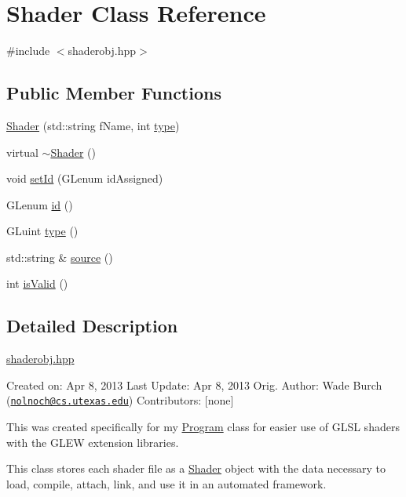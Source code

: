 \hypertarget{classShader}{\section{Shader Class Reference}
\label{classShader}
}


{\ttfamily \#include $<$shaderobj.\-hpp$>$}

\subsection*{Public Member Functions}
\begin{DoxyCompactItemize}
\item 
\hyperlink{classShader_a181d263cfc064acf22530f7118ba03a4}{Shader} (std\-::string f\-Name, int \hyperlink{classShader_ac4746e902a91f52548c588f3adb42f1a}{type})
\item 
virtual \hyperlink{classShader_aff01df87e8a102f270b5b135a295e59d}{$\sim$\-Shader} ()
\item 
void \hyperlink{classShader_a1dca74f97ac0d0d0da0367c9cfd7534d}{set\-Id} (G\-Lenum id\-Assigned)
\item 
G\-Lenum \hyperlink{classShader_ac0b61429aabf6baf4a58bae99c7d758d}{id} ()
\item 
G\-Luint \hyperlink{classShader_ac4746e902a91f52548c588f3adb42f1a}{type} ()
\item 
std\-::string \& \hyperlink{classShader_a50c4a4e3b42f80d7242091b307a52989}{source} ()
\item 
int \hyperlink{classShader_afdb38a3cb7674c7319fe0f4912e9f781}{is\-Valid} ()
\end{DoxyCompactItemize}


\subsection{Detailed Description}
\hyperlink{shaderobj_8hpp_source}{shaderobj.\-hpp}

Created on\-: Apr 8, 2013 Last Update\-: Apr 8, 2013 Orig. Author\-: Wade Burch (\href{mailto:nolnoch@cs.utexas.edu}{\tt nolnoch@cs.\-utexas.\-edu}) Contributors\-: \mbox{[}none\mbox{]}

This was created specifically for my \hyperlink{classProgram}{Program} class for easier use of G\-L\-S\-L shaders with the G\-L\-E\-W extension libraries.

This class stores each shader file as a \hyperlink{classShader}{Shader} object with the data necessary to load, compile, attach, link, and use it in an automated framework.

